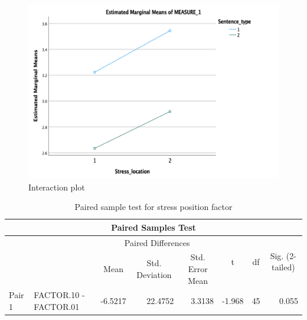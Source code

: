 \documentclass[a4paper]{article}
\begin{document}
\begin{figure}[H]
\begin{center} 
\includegraphics[scale=0.7]{interactionplot.png} 
\caption{Interaction plot}
\label{fig:interaction2}
\end{center}   
\end{figure}


\begin{table}[H]
\centering
      \caption{Paired sample test for stress position factor}
      \label{tab:inton2}
\begin{tabular}{|l|l|c|c|c|c|c|c|} 
\hline
\multicolumn{8}{|c|}{Paired Samples Test}                                                                                                                                                                                      \\ 
\hline
       &                       & \multicolumn{3}{c|}{Paired Differences}                                                           & \multirow{3}{*}{t}          & \multirow{3}{*}{df}     & \multirow{3}{*}{Sig. (2-tailed)}  \\ 
\cline{1-5}
       &                       & \multirow{2}{*}{Mean}        & \multirow{2}{*}{Std. Deviation} & \multirow{2}{*}{Std. Error Mean} &                             &                         &                                   \\ 
\cline{1-2}
       &                       &                              &                                 &                                  &                             &                         &                                   \\ 
\hline
Pair 1 & FACTOR.10 - FACTOR.01 & \multicolumn{1}{r|}{-6.5217} & \multicolumn{1}{r|}{22.4752}    & \multicolumn{1}{r|}{3.3138}      & \multicolumn{1}{r|}{-1.968} & \multicolumn{1}{r|}{45} & \multicolumn{1}{r|}{0.055}        \\
\hline
\end{tabular}
\end{table}
\end{document}
